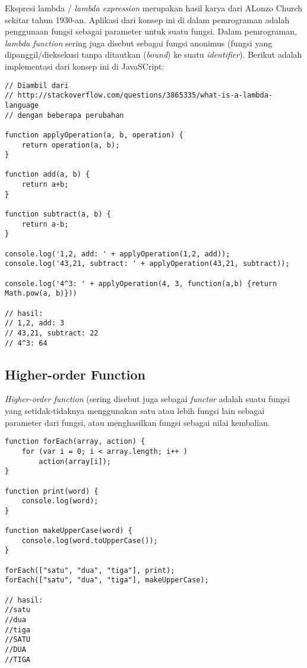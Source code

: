 Ekspresi lambda / \textit{lambda expression} merupakan hasil karya dari ALonzo Church sekitar tahun 1930-an. Aplikasi dari konsep ini di dalam pemrograman adalah penggunaan fungsi sebagai parameter untuk suatu fungsi. Dalam pemrograman, \textit{lambda function} sering juga disebut sebagai fungsi anonimus (fungsi yang dipanggil/dieksekusi tanpa ditautkan (\textit{bound}) ke suatu \textit{identifier}). Berikut adalah implementasi dari konsep ini di JavaSCript:

\lstset{language=JavaScript,caption=Ekspresi Lambda di JavaScript}
\begin{lstlisting}
// Diambil dari 
// http://stackoverflow.com/questions/3865335/what-is-a-lambda-language
// dengan beberapa perubahan

function applyOperation(a, b, operation) {
	return operation(a, b);
}

function add(a, b) {
	return a+b;
}

function subtract(a, b) {
	return a-b;
}

console.log('1,2, add: ' + applyOperation(1,2, add));
console.log('43,21, subtract: ' + applyOperation(43,21, subtract));

console.log('4^3: ' + applyOperation(4, 3, function(a,b) {return Math.pow(a, b)}))

// hasil:
// 1,2, add: 3
// 43,21, subtract: 22
// 4^3: 64
\end{lstlisting}

\subsection{Higher-order Function}

\textit{Higher-order function} (sering disebut juga sebagai \textit{functor} adalah suatu fungsi yang setidak-tidaknya menggunakan satu atau lebih fungsi lain sebagai parameter dari fungsi, atau menghasilkan fungsi sebagai nilai kembalian. 

\lstset{language=JavaScript,caption=Higher-order Function di JavaScript}
\begin{lstlisting}
function forEach(array, action) {
	for (var i = 0; i < array.length; i++ )
		action(array[i]);
}

function print(word) {
	console.log(word);
}

function makeUpperCase(word) {
	console.log(word.toUpperCase());
}

forEach(["satu", "dua", "tiga"], print);
forEach(["satu", "dua", "tiga"], makeUpperCase);

// hasil:
//satu
//dua
//tiga
//SATU
//DUA
//TIGA
\end{lstlisting}

